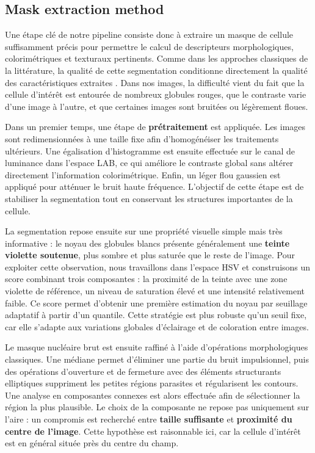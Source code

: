\documentclass[journal,twocolumn]{IEEEtran}
\begin{document}
\subsection{Mask extraction method}

Une étape clé de notre pipeline consiste donc à extraire un masque de cellule suffisamment précis pour permettre le calcul de descripteurs morphologiques, colorimétriques et texturaux pertinents. Comme dans les approches classiques de la littérature, la qualité de cette segmentation conditionne directement la qualité des caractéristiques extraites \cite{REZATOFIGHI2011333}. Dans nos images, la difficulté vient du fait que la cellule d’intérêt est entourée de nombreux globules rouges, que le contraste varie d’une image à l’autre, et que certaines images sont bruitées ou légèrement floues.

Dans un premier temps, une étape de \textbf{prétraitement} est appliquée. Les images sont redimensionnées à une taille fixe afin d’homogénéiser les traitements ultérieurs. Une égalisation d’histogramme est ensuite effectuée sur le canal de luminance dans l’espace LAB, ce qui améliore le contraste global sans altérer directement l’information colorimétrique. Enfin, un léger flou gaussien est appliqué pour atténuer le bruit haute fréquence. L’objectif de cette étape est de stabiliser la segmentation tout en conservant les structures importantes de la cellule.

La segmentation repose ensuite sur une propriété visuelle simple mais très informative : le noyau des globules blancs présente généralement une \textbf{teinte violette soutenue}, plus sombre et plus saturée que le reste de l’image. Pour exploiter cette observation, nous travaillons dans l’espace HSV et construisons un score combinant trois composantes : la proximité de la teinte avec une zone violette de référence, un niveau de saturation élevé et une intensité relativement faible. Ce score permet d’obtenir une première estimation du noyau par seuillage adaptatif à partir d’un quantile. Cette stratégie est plus robuste qu’un seuil fixe, car elle s’adapte aux variations globales d’éclairage et de coloration entre images.

Le masque nucléaire brut est ensuite raffiné à l’aide d’opérations morphologiques classiques. Une médiane permet d’éliminer une partie du bruit impulsionnel, puis des opérations d’ouverture et de fermeture avec des éléments structurants elliptiques suppriment les petites régions parasites et régularisent les contours. Une analyse en composantes connexes est alors effectuée afin de sélectionner la région la plus plausible. Le choix de la composante ne repose pas uniquement sur l’aire : un compromis est recherché entre \textbf{taille suffisante} et \textbf{proximité du centre de l’image}. Cette hypothèse est raisonnable ici, car la cellule d’intérêt est en général située près du centre du champ.
\end{document}
